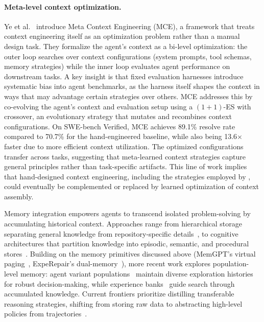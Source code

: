 \paragraph{Meta-level context optimization.} Ye et al.~\cite{ye2026meta} introduce Meta Context Engineering (MCE), a framework that treats context engineering itself as an optimization problem rather than a manual design task. They formalize the agent's context as a bi-level optimization: the outer loop searches over context configurations (system prompts, tool schemas, memory strategies) while the inner loop evaluates agent performance on downstream tasks. A key insight is that fixed evaluation harnesses introduce systematic bias into agent benchmarks, as the harness itself shapes the context in ways that may advantage certain strategies over others. MCE addresses this by co-evolving the agent's context and evaluation setup using a $(1{+}1)$-ES with crossover, an evolutionary strategy that mutates and recombines context configurations. On SWE-bench Verified, MCE achieves 89.1\% resolve rate compared to 70.7\% for the hand-engineered baseline, while also being 13.6$\times$ faster due to more efficient context utilization. The optimized configurations transfer across tasks, suggesting that meta-learned context strategies capture general principles rather than task-specific artifacts. This line of work implies that hand-designed context engineering, including the strategies employed by \name, could eventually be complemented or replaced by learned optimization of context assembly.

Memory integration empowers agents to transcend isolated problem-solving by accumulating historical context. Approaches range from hierarchical storage separating general knowledge from repository-specific details~\cite{issue_resolution_survey}, to cognitive architectures that partition knowledge into episodic, semantic, and procedural stores~\cite{mei2025survey, zhong2023memorybank, hu2025memory}. Building on the memory primitives discussed above (MemGPT's virtual paging~\cite{packer2023memgpt}, ExpeRepair's dual-memory~\cite{experepair}), more recent work explores population-level memory: agent variant populations~\cite{agent_populations} maintain diverse exploration histories for robust decision-making, while experience banks~\cite{experience_banks} guide search through accumulated knowledge. Current frontiers prioritize distilling transferable reasoning strategies, shifting from storing raw data to abstracting high-level policies from trajectories~\cite{issue_resolution_survey}.

